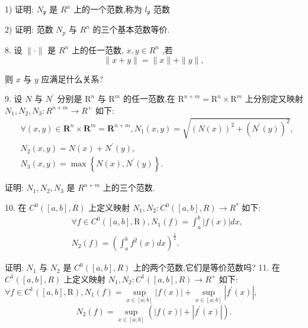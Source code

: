 1) 证明: ${N}_{\mathfrak{p}}$ 是 ${R}^{n}$ 上的一个范数,称为 ${l}_{\mathfrak{p}}$ 范数

2) 证明: 范数 ${N}_{p}$ 与 ${R}^{n}$ 的三个基本范数等价.

8. 设 $\parallel  \cdot  \parallel$ 是 ${R}^{n}$ 上的任一范数, $x,y \in  {R}^{n}$ ,若
$$\parallel x + y\parallel  = \parallel x\parallel  + \parallel y\parallel ,$$

则 $x$ 与 $y$ 应满足什么关系?

9. 设 $N$ 与 ${N}^{\prime }$ 分别是 ${\mathrm{R}}^{n}$ 与 ${\mathrm{R}}^{m}$ 的任一范数,在 ${\mathrm{R}}^{n + m} = {\mathrm{R}}^{n} \times  {\mathrm{R}}^{m}$ 上分别定又映射 ${N}_{1},{N}_{2},{N}_{3} : {R}^{n + m} \rightarrow  {R}^{ + }$ 如下:
\begin{align*}
	&\forall \left( {x,y}\right)  \in  {\mathbf{R}}^{n} \times  {\mathbf{R}}^{m} = {\mathbf{R}}^{n + m},{N}_{1}\left( {x,y}\right)  = \sqrt{{\left( N\left( x\right) \right) }^{2} + {\left( {N}^{\prime }\left( y\right) \right) }^{2}},\\
	&{N}_{2}\left( {x,y}\right)  = N\left( x\right)  + {N}^{\prime }\left( y\right) ,\\
	&{N}_{3}\left( {x,y}\right)  = \max \left\{  {N\left( x\right) ,{N}^{\prime }\left( y\right) }\right\}  .
\end{align*}

证明: ${N}_{1},{N}_{2},{N}_{3}$ 是 ${R}^{n + m}$ 上的三个范数.

10. 在 ${C}^{0}\left( {\left\lbrack  {a,b}\right\rbrack  ,R}\right)$ 上定义映射 ${N}_{1},{N}_{2} : {C}^{0}\left( {\left\lbrack  {a,b}\right\rbrack  ,R}\right)  \rightarrow  {R}^{ * }$ 如下:
\begin{align*}
	&\forall f \in  {C}^{0}\left( {\left\lbrack  {a,b}\right\rbrack  ,\mathrm{R}}\right) ,{N}_{1}\left( f\right)  = {\int }_{a}^{b}\left| {f\left( x\right) }\right| {dx},\\
	&{N}_{2}\left( f\right)  = {\left( {\int }_{a}^{b}{f}^{2}\left( x\right) dx\right) }^{\frac{1}{2}}.
\end{align*}

证明: ${N}_{1}$ 与 ${N}_{2}$ 是 ${C}^{0}\left( {\left\lbrack  {a,b}\right\rbrack  ,R}\right)$ 上的两个范数,它们是等价范数吗? 11. 在 ${C}^{1}\left( {\left\lbrack  {a,b}\right\rbrack  ,R}\right)$ 上定义映射 ${N}_{1},{N}_{2} : {C}^{1}\left( {\left\lbrack  {a,b}\right\rbrack  ,R}\right)  \rightarrow  {R}^{ + }$ 如下: $\forall f \in  {C}^{1}\left( {\left\lbrack  {a,b}\right\rbrack  ,\mathrm{R}}\right) ,{N}_{1}\left( f\right)  = \mathop{\sup }\limits_{{x \in  \left\lbrack  {a;b}\right\rbrack  }}\left| {f\left( x\right) }\right|  + \mathop{\sup }\limits_{{x \in  \left\lbrack  {a;b}\right\rbrack  }}\left| {{f}^{\prime }\left( x\right) }\right| ,$
$${N}_{2}\left( f\right)  = \mathop{\sup }\limits_{{x \in  \left\lbrack  {a;b}\right\rbrack  }}\left( {\left| {f\left( x\right) }\right|  + \left| {{f}^{\prime }\left( x\right) }\right| }\right) .$$

